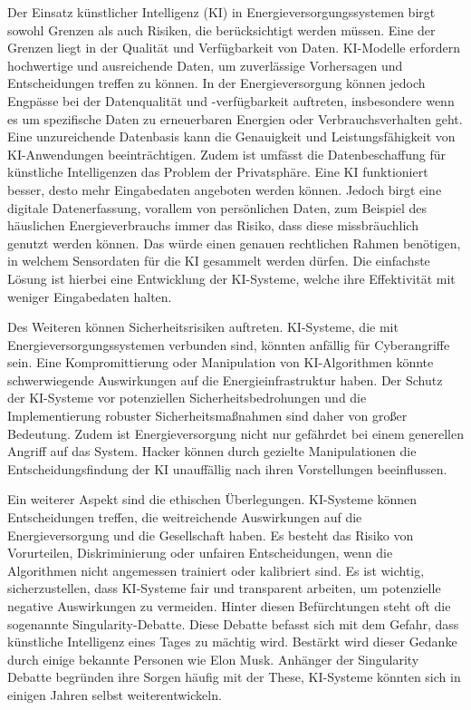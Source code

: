 Der Einsatz künstlicher Intelligenz (KI) in Energieversorgungssystemen birgt
sowohl Grenzen als auch Risiken, die berücksichtigt werden müssen. Eine der
Grenzen liegt in der Qualität und Verfügbarkeit von Daten. KI-Modelle erfordern
hochwertige und ausreichende Daten, um zuverlässige Vorhersagen und
Entscheidungen treffen zu können. In der Energieversorgung können jedoch
Engpässe bei der Datenqualität und -verfügbarkeit auftreten, insbesondere wenn
es um spezifische Daten zu erneuerbaren Energien oder Verbrauchsverhalten geht.
Eine unzureichende Datenbasis kann die Genauigkeit und Leistungsfähigkeit von
KI-Anwendungen beeinträchtigen. Zudem ist umfässt die Datenbeschaffung für
künstliche Intelligenzen das Problem der Privatsphäre. Eine KI funktioniert
besser, desto mehr Eingabedaten angeboten werden können. Jedoch birgt eine
digitale Datenerfassung, vorallem von persönlichen Daten, zum Beispiel des
häuslichen Energieverbrauchs immer das Risiko, dass diese missbräuchlich
genutzt werden können. Das würde einen genauen rechtlichen Rahmen benötigen, in
welchem Sensordaten für die KI gesammelt werden dürfen. Die einfachste Lösung
ist hierbei eine Entwicklung der KI-Systeme, welche ihre Effektivität mit
weniger Eingabedaten halten.\cite{dreyer2019kunstliche}

Des Weiteren können Sicherheitsrisiken auftreten. KI-Systeme, die mit
Energieversorgungssystemen verbunden sind, könnten anfällig für Cyberangriffe
sein. Eine Kompromittierung oder Manipulation von KI-Algorithmen könnte
schwerwiegende Auswirkungen auf die Energieinfrastruktur haben. Der Schutz der
KI-Systeme vor potenziellen Sicherheitsbedrohungen und die Implementierung
robuster Sicherheitsmaßnahmen sind daher von großer Bedeutung. Zudem ist
Energieversorgung nicht nur gefährdet bei einem generellen Angriff auf das
System. Hacker können durch gezielte Manipulationen die Entscheidungsfindung
der KI unauffällig nach ihren Vorstellungen beeinflussen.
\cite{dreyer2019kunstliche}

Ein weiterer Aspekt sind die ethischen Überlegungen. KI-Systeme können
Entscheidungen treffen, die weitreichende Auswirkungen auf die
Energieversorgung und die Gesellschaft haben. Es besteht das Risiko von
Vorurteilen, Diskriminierung oder unfairen Entscheidungen, wenn die Algorithmen
nicht angemessen trainiert oder kalibriert sind. Es ist wichtig,
sicherzustellen, dass KI-Systeme fair und transparent arbeiten, um potenzielle
negative Auswirkungen zu vermeiden. Hinter diesen Befürchtungen steht oft die
sogenannte Singularity-Debatte. Diese Debatte befasst sich mit dem Gefahr, dass
künstliche Intelligenz eines Tages zu mächtig wird. Bestärkt wird dieser
Gedanke durch einige bekannte Personen wie Elon Musk. Anhänger der Singularity
Debatte begründen ihre Sorgen häufig mit der These, KI-Systeme könnten sich in
einigen Jahren selbst weiterentwickeln.\cite{buxmann2021ethische}

